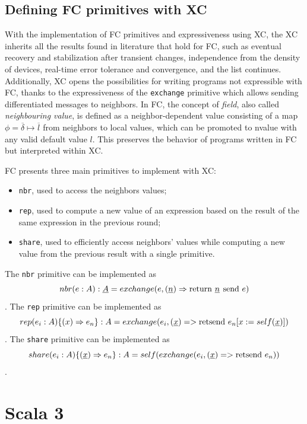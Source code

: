 \subsection{Defining FC primitives with XC}

With the implementation of \ac{FC} primitives and expressiveness using \ac{XC}, the \ac{XC} inherits all the results found in literature that hold for \ac{FC}, such as eventual recovery and stabilization after transient changes\cite{self-stabilisation-in-fc}, independence from the density of devices\cite{density-independence-in-fc}, real-time error tolerance and convergence\cite{real-time-error-tolerance-in-fc}, and the list continues\cite{xc}.
%
Additionally, \ac{XC} opens the possibilities for writing programs not expressible with \ac{FC}, thanks to the expressiveness of the \texttt{exchange} primitive which allows sending differentiated messages to neighbors.
%
In \ac{FC}, the concept of \textit{field}, also called \textit{neighbouring value}, is defined as a neighbor-dependent value consisting of a map $\phi = \overline{\delta} \mapsto \overline{l}$ from neighbors to local values, which can be promoted to nvalue with any valid default value $l$.
%
This preserves the behavior of programs written in \ac{FC} but interpreted within \ac{XC}\cite{xc}.

\ac{FC} presents three main primitives to implement with \ac{XC}:
\begin{itemize}
    \item \texttt{nbr}, used to access the neighbors values\cite{from-dc-to-fc-and-ap};
    \item \texttt{rep}, used to compute a new value of an expression based on the result of the same expression in the previous round\cite{from-dc-to-fc-and-ap};
    \item \texttt{share}, used to efficiently access neighbors' values while computing a new value from the previous result with a single primitive\cite{share-operator}.
\end{itemize}

The \texttt{nbr} primitive can be implemented as $$nbr(e: A): \underline{A} = exchange(e, (\underline{n}) \Rightarrow \operatorname{return\,} \underline{n} \operatorname{\:send\,} e)$$.
%
The \texttt{rep} primitive can be implemented as $$rep(e_i: A)\{(x) \Rightarrow e_n\}: A = exchange(e_i, (\underline{x}) => \operatorname{retsend\,} e_n[x := self(\underline{x})])$$.
%
The \texttt{share} primitive can be implemented as $$share(e_i: A)\{(\underline{x}) \Rightarrow e_n\}: A = self(exchange(e_i, (\underline{x}) => \operatorname{retsend\,} e_n))$$.

\section{Scala 3}\label{chap:background->sec:scala3}
